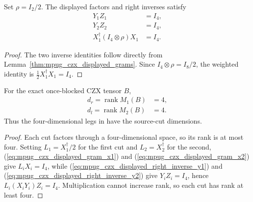 \begin{lemma}
    \label{thm:mpug_czx_displayed_normalizations}
    \leanok
    Set $\rho=I_2/2$. The displayed factors and right inverses satisfy
    \begin{align}
        Y_1Z_1                         & =I_4,
        \label{eq:mpug_czx_displayed_right_inverse_y1} \\
        Y_2Z_2                         & =I_4,
        \label{eq:mpug_czx_displayed_right_inverse_y2} \\
        X_1^\dagger(I_4\otimes\rho)X_1 & =I_4.
    \end{align}
\end{lemma}

\begin{proof}\leanok
    The two inverse identities follow directly from
    Lemma~\ref{thm:mpug_czx_displayed_grams}. Since
    $I_4\otimes\rho=I_8/2$, the weighted identity is
    $\tfrac12X_1^\dagger X_1=I_4$.
\end{proof}

\begin{lemma}
    \label{thm:mpug_czx_displayed_ranks}
    \leanok
    For the exact once-blocked CZX tensor $B$,
    \begin{align}
        d_r=\operatorname{rank}M_1(B) & =4, \\
        d_l=\operatorname{rank}M_2(B) & =4.
    \end{align}
    Thus the four-dimensional legs in
    \cite[lines~4559--4659]{FrancoRubio2025MPUGauging} have the
    source-cut dimensions.
\end{lemma}

\begin{proof}\leanok
    Each cut factors through a four-dimensional space, so its rank is at
    most four. Setting $L_1=X_1^\dagger/2$ for the first cut and
    $L_2=X_2^\dagger$ for the second, (\ref{eq:mpug_czx_displayed_gram_x1})
    and (\ref{eq:mpug_czx_displayed_gram_x2}) give $L_iX_i=I_4$, while
    (\ref{eq:mpug_czx_displayed_right_inverse_y1}) and
    (\ref{eq:mpug_czx_displayed_right_inverse_y2}) give $Y_iZ_i=I_4$, hence
    $L_i(X_iY_i)Z_i=I_4$. Multiplication cannot increase rank, so each cut
    has rank at least four.
\end{proof}

